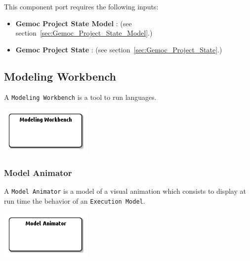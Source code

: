 \documentclass{gemoc} %
\begin{document}
This component port requires the following inputs:
\begin{itemize}
  \item \textbf{Gemoc Project State Model} :
(see section~\ref{sec:Gemoc_Project_State_Model}.)
  \item \textbf{Gemoc Project State} :
(see section~\ref{sec:Gemoc_Project_State}.)
\end{itemize}




\subsection{Modeling Workbench}
\label{sec:Modeling_Workbench}
A \texttt{Modeling Workbench} is a tool to run languages.
\begin{center}
\includegraphics*[trim=0.0cm 0.0cm 0cm 0.0cm, clip=true]{../images/generated/Generated_Modeling_Workbench.png}
\end{center}



\subsubsection{Model Animator}
\label{sec:Model_Animator}
A \texttt{Model Animator} is a model of a visual animation which consists to display at run time the behavior of an \texttt{Execution Model}.
\begin{center}
\includegraphics*[trim=0.0cm 0.0cm 0cm 0.0cm, clip=true]{../images/generated/Generated_Model_Animator.png}
\end{center}
\end{document}
